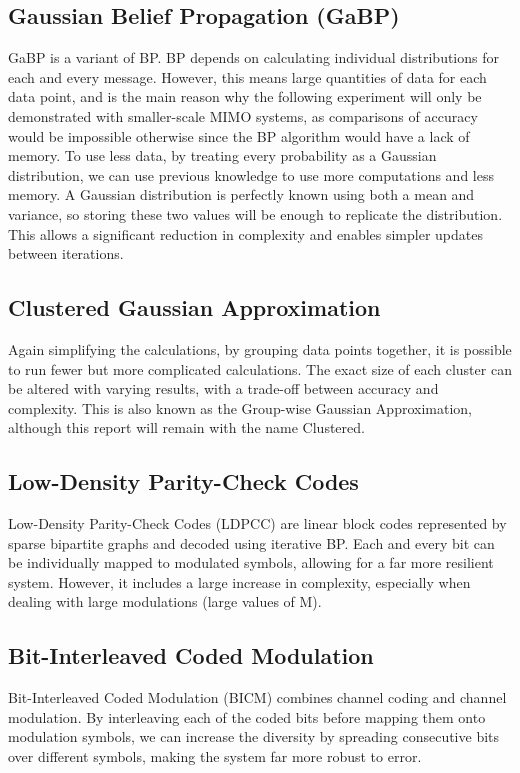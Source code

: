 \documentclass[conference]{IEEEtran}
\begin{document}
\subsection{Gaussian Belief Propagation (GaBP)}
GaBP is a variant of BP. BP depends on calculating individual distributions for each and every message. However, this means large quantities of data for each data point, and is the main reason why the following experiment will only be demonstrated with smaller-scale MIMO systems, as comparisons of accuracy would be impossible otherwise since the BP algorithm would have a lack of memory. To use less data, by treating every probability as a Gaussian distribution, we can use previous knowledge to use more computations and less memory. A Gaussian distribution is perfectly known using both a mean and variance, so storing these two values will be enough to replicate the distribution. This allows a significant reduction in complexity and enables simpler updates between iterations.

\subsection{Clustered Gaussian Approximation}
Again simplifying the calculations, by grouping data points together, it is possible to run fewer but more complicated calculations. The exact size of each cluster can be altered with varying results, with a trade-off between accuracy and complexity. This is also known as the Group-wise Gaussian Approximation, although this report will remain with the name Clustered.

\subsection{Low-Density Parity-Check Codes}
Low-Density Parity-Check Codes (LDPCC) are linear block codes represented by sparse bipartite graphs and decoded using iterative BP. Each and every bit can be individually mapped to modulated symbols, allowing for a far more resilient system. However, it includes a large increase in complexity, especially when dealing with large modulations (large values of M).

\subsection{Bit-Interleaved Coded Modulation}
Bit-Interleaved Coded Modulation (BICM) combines channel coding and channel modulation. By interleaving each of the coded bits before mapping them onto modulation symbols, we can increase the diversity by spreading consecutive bits over different symbols, making the system far more robust to error.
\end{document}

